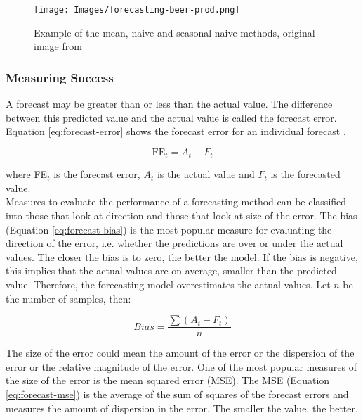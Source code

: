 \begin{figure}[H]
\begin{center}
    \texttt{[image: Images/forecasting-beer-prod.png]}
    \caption{Example of the mean, naive and seasonal naive methods, original image from \cite{forecasting-book}}
    \label{fig:forecasting}
\end{center}
\end{figure}

\subsubsection{Measuring Success}

A forecast may be greater than or less than the actual value. The difference between this predicted value and the actual value is called the forecast error. Equation \ref{eq:forecast-error} shows the forecast error for an individual forecast \cite{forecasting-performance-measures}.

\begin{equation}
\label{eq:forecast-error}
    \mathrm{FE}_t = A_t - F_t
\end{equation}

\noindent where FE$_t$ is the forecast error, $A_t$ is the actual value and $F_t$ is the forecasted value. \\

Measures to evaluate the performance of a forecasting method can be classified into those that look at direction and those that look at size of the error. The bias (Equation \ref{eq:forecast-bias}) is the most popular measure for evaluating the direction of the error, i.e. whether the predictions are over or under the actual values. The closer the bias is to zero, the better the model. If the bias is negative, this implies that the actual values are on average, smaller than the predicted value. Therefore, the forecasting model overestimates the actual values. Let $n$ be the number of samples, then:

\begin{equation}
\label{eq:forecast-bias}
    Bias = \frac{\sum(A_t-F_t)}{n}
\end{equation}

The size of the error could mean the amount of the error or the dispersion of the error or the relative magnitude of the error. One of the most popular measures of the size of the error is the mean squared error (MSE). The MSE (Equation \ref{eq:forecast-mse}) is the average of the sum of squares of the forecast errors and measures the amount of dispersion in the error. The smaller the value, the better.

